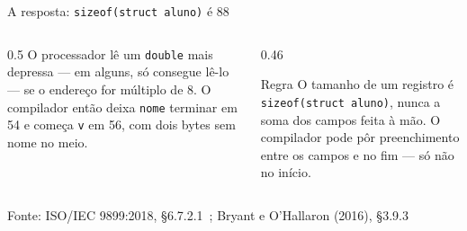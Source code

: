 \documentclass[aspectratio=169]{beamer}
\newcommand{\fonte}[1]{\vfill\hfill{\scriptsize\textcolor{UFSGray}{Fonte: #1}}}
\begin{document}
\begin{frame}{A resposta: \texttt{sizeof(struct aluno)} é 88}
  \begin{center}
  \end{center}
  \vspace{-0.4em}
  \begin{columns}[T]
    \begin{column}{0.5\textwidth}
      \small O processador lê um \texttt{double} mais depressa --- em alguns,
      só consegue lê-lo --- se o endereço for múltiplo de 8. O compilador
      então deixa \texttt{nome} terminar em 54 e começa \texttt{v} em 56,
      com dois bytes sem nome no meio.
    \end{column}
    \begin{column}{0.46\textwidth}
      \begin{block}{Regra}
        \small O tamanho de um registro é \texttt{sizeof(struct aluno)},
        nunca a soma dos campos feita à mão. O compilador pode pôr
        preenchimento entre os campos e no fim --- só não no início.
      \end{block}
    \end{column}
  \end{columns}
  \fonte{ISO/IEC 9899:2018, §6.7.2.1~\cite{iso2018c17};
    Bryant e O'Hallaron (2016), §3.9.3~\cite{bryant2016computer}}
\end{frame}
\end{document}
